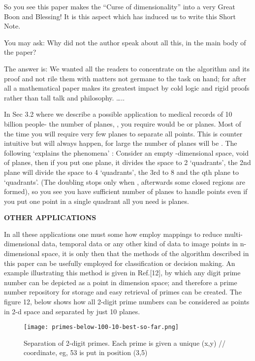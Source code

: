 \documentclass[english]{article}
\begin{document}
So you see this paper makes the {}``Curse of dimensionality'' into
a very Great Boon and Blessing! It is this aspect which has induced us to
 write this Short Note.

You may ask: Why did not the author speak about all this, in the main
body of the paper?

The answer is: We wanted all the readers to concentrate on the algorithm
and its proof and not rile them with matters not germane to the task
on hand; for after all a mathematical paper makes its greatest impact
by cold logic and rigid proofs rather than tall talk and philosophy.
\ldots{}.. 

In Sec 3.2 where we describe a possible application to medical records
of 10 billion people- the number of planes, , you require would
be  or  planes. Most of the time you will require very few
planes to separate all points. This is counter intuitive but will
always happen, for large  the number of planes  will be .
The following `explains the phenomena\textquoteright{} : Consider
an empty -dimensional space, void of planes, then if you put one
plane, it divides the space to 2 `quadrants\textquoteright{}, the
2nd plane will divide the space to 4 `quadrants\textquoteright{},
the 3rd to 8 and the qth plane to `quadrants\textquoteright{}.
(The doubling stops only when  , afterwards some closed regions
are formed), so you see you have sufficient number of planes 
to handle  points even if you put one point in a single quadrant
all you need is planes.

\medskip{}


\textbf{\large OTHER APPLICATIONS }{\large \par}

In all these applications one must some how employ mappings to reduce
multi-dimensional data, temporal data or any other kind of data to
image points in n-dimensional space, it is only then that the methods
of the algorithm described in this paper can be usefully employed
for classification or decision making. An example illustrating this method is given in Ref.[12], by which any digit prime number can be depicted as a point in  dimension space; and therefore a prime number repository for storage and easy retrieval of primes can be created. The figure 12, 
 below shows how all 2-digit prime numbers can be considered as points in 2-d space and separated by just 10 planes.

\medskip{}
\begin{figure}[htp]
 \begin{center}
\texttt{[image: primes-below-100-10-best-so-far.png]}
\caption{Separation of 2-digit primes. Each prime is given a unique (x,y) // coordinate, eg, 53 is put in position (3,5)}

\label{fig:fig-m} \end{center}
\end{figure} 
\medskip{}
\end{document}
